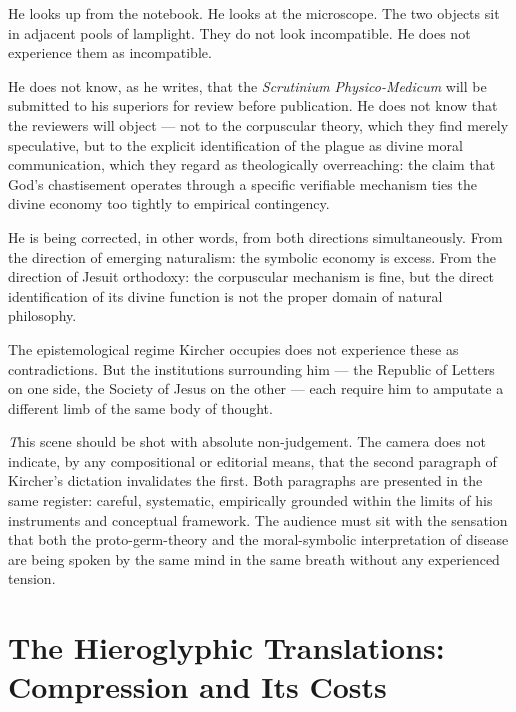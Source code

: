 \documentclass[12pt, a4paper, twoside]{memoir}
\theoremstyle{definition}
\theoremstyle{remark}
\newenvironment{action}{%
  \vspace{4pt}%
  \noindent\begin{minipage}{\linewidth}%
  \setlength{\parindent}{0pt}%
  \itshape\color{kircherink}%
}{%
  \end{minipage}\vspace{6pt}%
}
\newenvironment{visual}{%
  \vspace{6pt}%
  \noindent\begin{mdframed}[
    linecolor=plaguegrey,
    linewidth=0.4pt,
    leftline=true, rightline=false, topline=false, bottomline=false,
    innerleftmargin=8pt,
    innerrightmargin=0pt,
    innertopmargin=2pt,
    innerbottommargin=2pt,
    backgroundcolor=white
  ]%
  \footnotesize\color{plaguegrey}\textit
}{%
  \end{mdframed}\vspace{4pt}%
}
\begin{document}
\begin{action}
He looks up from the notebook. He looks at the microscope. The two objects sit in adjacent pools of lamplight. They do not look incompatible. He does not experience them as incompatible.

He does not know, as he writes, that the \textit{Scrutinium Physico-Medicum} will be submitted to his superiors for review before publication. He does not know that the reviewers will object --- not to the corpuscular theory, which they find merely speculative, but to the explicit identification of the plague as divine moral communication, which they regard as theologically overreaching: the claim that God's chastisement operates through a specific verifiable mechanism ties the divine economy too tightly to empirical contingency.

He is being corrected, in other words, from both directions simultaneously. From the direction of emerging naturalism: the symbolic economy is excess. From the direction of Jesuit orthodoxy: the corpuscular mechanism is fine, but the direct identification of its divine function is not the proper domain of natural philosophy.

The epistemological regime Kircher occupies does not experience these as contradictions. But the institutions surrounding him --- the Republic of Letters on one side, the Society of Jesus on the other --- each require him to amputate a different limb of the same body of thought.
\end{action}

\begin{visual}
This scene should be shot with absolute non-judgement. The camera does not indicate, by any compositional or editorial means, that the second paragraph of Kircher's dictation invalidates the first. Both paragraphs are presented in the same register: careful, systematic, empirically grounded within the limits of his instruments and conceptual framework. The audience must sit with the sensation that both the proto-germ-theory and the moral-symbolic interpretation of disease are being spoken by the same mind in the same breath without any experienced tension.
\end{visual}

\clearpage

\section{The Hieroglyphic Translations: Compression and Its Costs}
\end{document}
